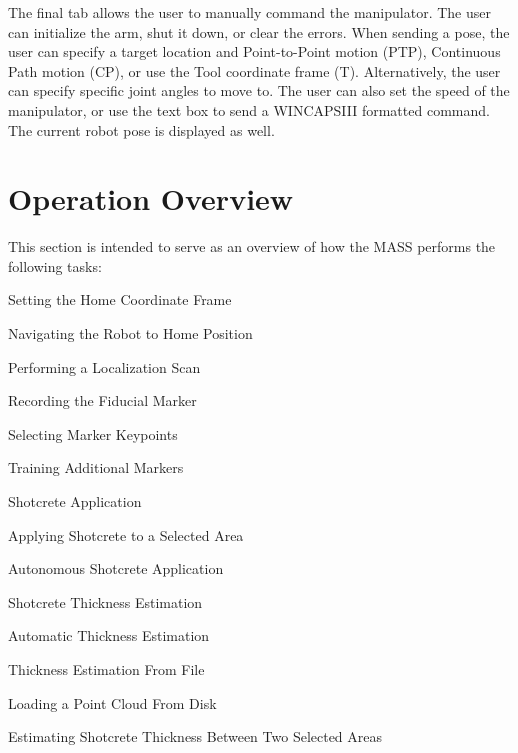 The final tab allows the user to manually command the manipulator. The user can initialize the arm, shut it down, or clear the errors. When sending a pose, the user can specify a target location and Point-to-Point motion (PTP), Continuous Path motion (CP), or use the Tool coordinate frame (T). Alternatively, the user can specify specific joint angles to move to. The user can also set the speed of the manipulator, or use the text box to send a WINCAPSIII formatted command. The current robot pose is displayed as well.\\
\clearpage
\section{Operation Overview}
\label{sec:manual}
This section is intended to serve as an overview of how the MASS performs the following tasks:
\begin{myitemize}
\item Setting the Home Coordinate Frame
\begin{myitemize}
\item Navigating the Robot to Home Position
\item Performing a Localization Scan
\end{myitemize}
\item Recording the Fiducial Marker
\begin{myitemize}
\item Selecting Marker Keypoints
\item Training Additional Markers
\end{myitemize}
\item Shotcrete Application
\begin{myitemize}
\item Applying Shotcrete to a Selected Area
\item Autonomous Shotcrete Application
\end{myitemize}
\item Shotcrete Thickness Estimation
\begin{myitemize}
\item Automatic Thickness Estimation
\item Thickness Estimation From File
\item Loading a Point Cloud From Disk
\item Estimating Shotcrete Thickness Between Two Selected Areas
\end{myitemize}
\end{myitemize}
\newpage
